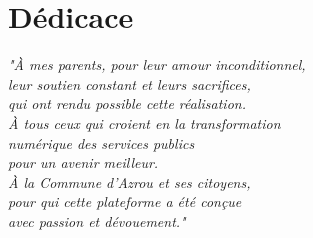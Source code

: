 \chapter*{Dédicace}
\thispagestyle{empty}

\vspace*{3cm}

\begin{center}
\textit{
"À mes parents, pour leur amour inconditionnel,\\
leur soutien constant et leurs sacrifices,\\
qui ont rendu possible cette réalisation.\\[1cm]

À tous ceux qui croient en la transformation\\
numérique des services publics\\
pour un avenir meilleur.\\[1cm]

À la Commune d'Azrou et ses citoyens,\\
pour qui cette plateforme a été conçue\\
avec passion et dévouement."
}
\end{center}

\vfill

